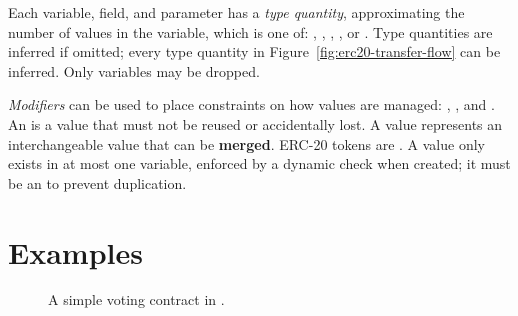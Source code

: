 \documentclass[dvipsnames, sigplan, screen]{acmart}
\begin{document}
Each variable, field, and parameter has a \emph{type quantity}, approximating the number of values in the variable, which is one of: , , , , or .
Type quantities are inferred if omitted; every type quantity in Figure~\ref{fig:erc20-transfer-flow} can be inferred.
Only  \assetTxt variables may be dropped.

\emph{Modifiers} can be used to place constraints on how values are managed: , , and . %
An  is a value that must not be reused or accidentally lost.
A  value represents an interchangeable value that can be \textbf{merged}. %
ERC-20 tokens are .
A  value only exists in at most one variable, enforced by a dynamic check when created; it must be an  to prevent duplication.


\section{Examples}
\begin{figure}[!b]
    \centering
    
    \vspace{-1em}
    \caption{A simple voting contract in \langName.}
    \label{fig:voting-impl-flow}
\end{figure}
\end{document}
